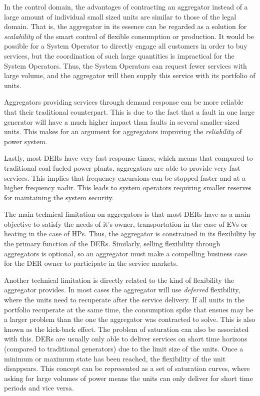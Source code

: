 In the control domain, the advantages of contracting an aggregator instead of a large amount of individual small sized units are similar to those of the legal domain. That is, the aggregator in its essence can be regarded as a solution for \emph{scalability} of the smart control of flexible consumption or production. It would be possible for a System Operator to directly engage all customers in order to buy services, but the coordination of such large quantities is impractical for the System Operators. Thus, the System Operators can request fewer services with large volume, and the aggregator will then supply this service with its portfolio of units.

Aggregators providing services through demand response can be more reliable that their traditional counterpart. This is due to the fact that a fault in one large generator will have a much higher impact than faults in several smaller-sized units. This makes for an argument for aggregators improving the \emph{reliability} of power system.

Lastly, most DERs have very fast response times, which means that compared to traditional coal-fueled power plants, aggregators are able to provide very fast services. This implies that frequency excursions can be stopped faster and at a higher frequency nadir. This leads to system operators requiring smaller reserves for maintaining  the system security.

The main technical limitation on aggregators is that most DERs have as a main objective to satisfy the needs of it's owner, \eg transportation in the case of EVs or heating in the case of HPs. Thus, the aggregator is constrained in its flexibility by the primary function of the DERs. Similarly, selling flexibility through aggregators is optional, so an aggregator must make a compelling business case for the DER owner to participate in the service markets.

Another technical limitation is directly related to the kind of flexibility the aggregator provides. In most cases the aggregator will use \emph{deferred} flexibility, where the units need to recuperate after the service delivery. If all units in the portfolio recuperate at the same time, the consumption spike that ensues may be a larger problem than the one the aggregator was contracted to solve. This is also known as the kick-back effect. The problem of saturation can also be associated with this. DERs are usually only able to deliver services on short time horizons (compared to traditional generators) due to the limit size of the units. Once a minimum or maximum state has been reached, the flexibility of the unit disappears. This concept can be represented as a set of saturation curves, where asking for large volumes of power means the units can only deliver for short time periods and vice versa.

